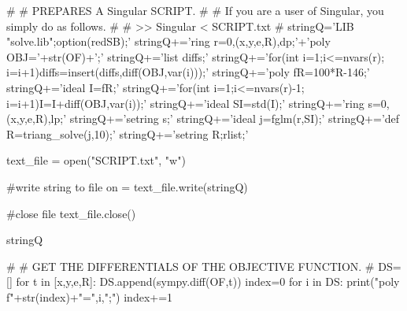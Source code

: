 #
# PREPARES A Singular SCRIPT. 
#
#  If you are a user of Singular, you simply do as follows.
#
#  >> Singular < SCRIPT.txt
#
stringQ='LIB "solve.lib";option(redSB);\n'
stringQ+='ring r=0,(x,y,e,R),dp;\n'+'poly OBJ='+str(OF)+';\n'
stringQ+='list diffs;\n'
stringQ+='for(int i=1;i<=nvars(r); i=i+1){diffs=insert(diffs,diff(OBJ,var(i)));}\n'
stringQ+='poly fR=100*R-146;\n'
stringQ+='ideal I=fR;\n'
stringQ+='for(int i=1;i<=nvars(r)-1; i=i+1){I=I+diff(OBJ,var(i));}\n'
stringQ+='ideal SI=std(I);\n'
stringQ+='ring s=0,(x,y,e,R),lp;\n'
stringQ+='setring s;\n'
stringQ+='ideal j=fglm(r,SI);\n'
stringQ+='def R=triang_solve(j,10);\n'
stringQ+='setring R;rlist;'

text_file = open("SCRIPT.txt", "w")
 
#write string to file
on = text_file.write(stringQ)
 
#close file
text_file.close()

stringQ

#
# GET THE DIFFERENTIALS OF THE OBJECTIVE FUNCTION.
#
DS=[]
for t in [x,y,e,R]:
    DS.append(sympy.diff(OF,t))
index=0
for i in DS:
    print("poly f"+str(index)+"=",i,";")
    index+=1

